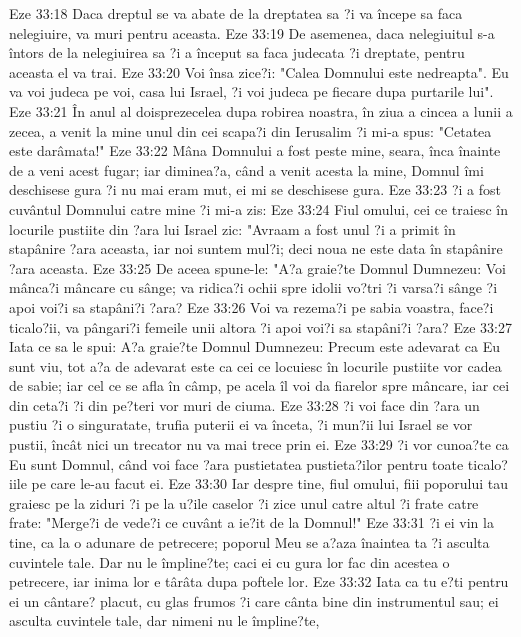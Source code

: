 Eze 33:18  Daca dreptul se va abate de la dreptatea sa ?i va începe sa faca nelegiuire, va muri pentru aceasta.
Eze 33:19  De asemenea, daca nelegiuitul s-a întors de la nelegiuirea sa ?i a început sa faca judecata ?i dreptate, pentru aceasta el va trai.
Eze 33:20  Voi însa zice?i: "Calea Domnului este nedreapta". Eu va voi judeca pe voi, casa lui Israel, ?i voi judeca pe fiecare dupa purtarile lui".
Eze 33:21  În anul al doisprezecelea dupa robirea noastra, în ziua a cincea a lunii a zecea, a venit la mine unul din cei scapa?i din Ierusalim ?i mi-a spus: "Cetatea este darâmata!"
Eze 33:22  Mâna Domnului a fost peste mine, seara, înca înainte de a veni acest fugar; iar diminea?a, când a venit acesta la mine, Domnul îmi deschisese gura ?i nu mai eram mut, ei mi se deschisese gura.
Eze 33:23  ?i a fost cuvântul Domnului catre mine ?i mi-a zis:
Eze 33:24  Fiul omului, cei ce traiesc în locurile pustiite din ?ara lui Israel zic: "Avraam a fost unul ?i a primit în stapânire ?ara aceasta, iar noi suntem mul?i; deci noua ne este data în stapânire ?ara aceasta.
Eze 33:25  De aceea spune-le: "A?a graie?te Domnul Dumnezeu: Voi mânca?i mâncare cu sânge; va ridica?i ochii spre idolii vo?tri ?i varsa?i sânge ?i apoi voi?i sa stapâni?i ?ara?
Eze 33:26  Voi va rezema?i pe sabia voastra, face?i ticalo?ii, va pângari?i femeile unii altora ?i apoi voi?i sa stapâni?i ?ara?
Eze 33:27  Iata ce sa le spui: A?a graie?te Domnul Dumnezeu: Precum este adevarat ca Eu sunt viu, tot a?a de adevarat este ca cei ce locuiesc în locurile pustiite vor cadea de sabie; iar cel ce se afla în câmp, pe acela îl voi da fiarelor spre mâncare, iar cei din ceta?i ?i din pe?teri vor muri de ciuma.
Eze 33:28  ?i voi face din ?ara un pustiu ?i o singuratate, trufia puterii ei va înceta, ?i mun?ii lui Israel se vor pustii, încât nici un trecator nu va mai trece prin ei.
Eze 33:29  ?i vor cunoa?te ca Eu sunt Domnul, când voi face ?ara pustietatea pustieta?ilor pentru toate ticalo?iile pe care le-au facut ei.
Eze 33:30  Iar despre tine, fiul omului, fiii poporului tau graiesc pe la ziduri ?i pe la u?ile caselor ?i zice unul catre altul ?i frate catre frate: "Merge?i de vede?i ce cuvânt a ie?it de la Domnul!"
Eze 33:31  ?i ei vin la tine, ca la o adunare de petrecere; poporul Meu se a?aza înaintea ta ?i asculta cuvintele tale. Dar nu le împline?te; caci ei cu gura lor fac din acestea o petrecere, iar inima lor e târâta dupa poftele lor.
Eze 33:32  Iata ca tu e?ti pentru ei un cântare? placut, cu glas frumos ?i care cânta bine din instrumentul sau; ei asculta cuvintele tale, dar nimeni nu le împline?te,
